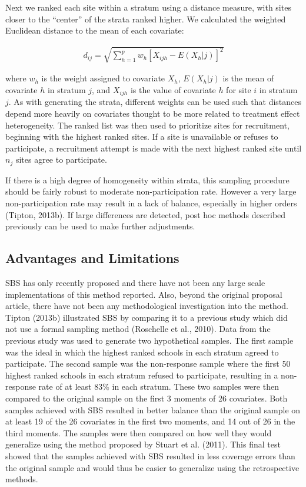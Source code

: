 \documentclass[man,floatsintext]{apa6}
\theoremstyle{definition}
\theoremstyle{definition}
\theoremstyle{definition}
\theoremstyle{remark}
\begin{document}
Next we ranked each site within a stratum using a distance measure, with
sites closer to the \enquote{center} of the strata ranked higher. We
calculated the weighted Euclidean distance to the mean of each
covariate:

\begin{align} \label{eq:euclid}
  d_{ij} = \sqrt{\sum^p_{h=1}w_h[X_{ijh} - E(X_h|j)]^2}
\end{align}

where \(w_h\) is the weight assigned to covariate \(X_h\), \(E(X_h|j)\)
is the mean of covariate \(h\) in stratum \(j\), and \(X_{ijh}\) is the
value of covariate \(h\) for site \(i\) in stratum \(j\). As with
generating the strata, different weights can be used such that distances
depend more heavily on covariates thought to be more related to
treatment effect heterogeneity. The ranked list was then used to
prioritize sites for recruitment, beginning with the highest ranked
sites. If a site is unavailable or refuses to participate, a recruitment
attempt is made with the next highest ranked site until \(n_j\) sites
agree to participate.

If there is a high degree of homogeneity within strata, this sampling
procedure should be fairly robust to moderate non-participation rate.
However a very large non-participation rate may result in a lack of
balance, especially in higher orders (Tipton, 2013b). If large
differences are detected, post hoc methods described previously can be
used to make further adjustments.

\hypertarget{advantages-and-limitations}{%
\subsection{Advantages and
Limitations}\label{advantages-and-limitations}}

SBS has only recently proposed and there have not been any large scale
implementations of this method reported. Also, beyond the original
proposal article, there have not been any methodological investigation
into the method. Tipton (2013b) illustrated SBS by comparing it to a
previous study which did not use a formal sampling method (Roschelle et
al., 2010). Data from the previous study was used to generate two
hypothetical samples. The first sample was the ideal in which the
highest ranked schools in each stratum agreed to participate. The second
sample was the non-response sample where the first 50 highest ranked
schools in each stratum refused to participate, resulting in a
non-response rate of at least 83\% in each stratum. These two samples
were then compared to the original sample on the first 3 moments of 26
covariates. Both samples achieved with SBS resulted in better balance
than the original sample on at least 19 of the 26 covariates in the
first two moments, and 14 out of 26 in the third moments. The samples
were then compared on how well they would generalize using the method
proposed by Stuart et al. (2011). This final test showed that the
samples achieved with SBS resulted in less coverage errors than the
original sample and would thus be easier to generalize using the
retrospective methods.
\end{document}
